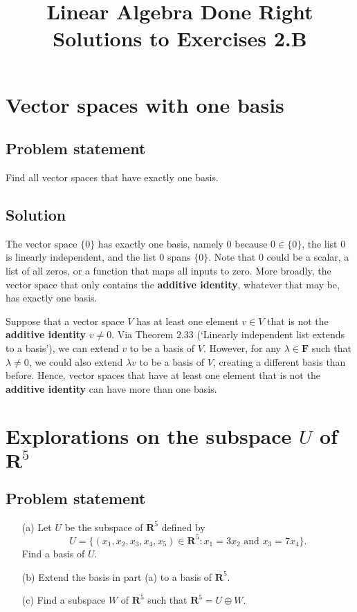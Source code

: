 \documentclass{article}
\title{Linear Algebra Done Right\\Solutions to Exercises 2.B}
\author{}
\date{}
\begin{document}
\maketitle

\section{Vector spaces with one basis}
\subsection*{Problem statement}
Find all vector spaces that have exactly one basis.

\subsection*{Solution}
The vector space $\{0\}$ has exactly one basis, namely $0$ because $0\in\{0\}$, the list $0$ is linearly independent, and the list $0$ spans $\{0\}$. 
Note that $0$ could be a scalar, a list of all zeros, or a function that maps all inputs to zero. 
More broadly, the vector space that only contains the \textbf{additive identity}, whatever that may be, has exactly one basis. 

Suppose that a vector space $V$ has at least one element $v\in V$ that is not the \textbf{additive identity} $v\neq0$. 
Via Theorem 2.33 (`Linearly independent list extends to a basis'), we can extend $v$ to be a basis of $V$. 
However, for any $\lambda\in\mathbf{F}$ such that $\lambda\neq 0$, we could also extend $\lambda v$ to be a basis of $V$, creating a different basis than before. 
Hence, vector spaces that have at least one element that is not the \textbf{additive identity} can have more than one basis.

\clearpage

\section{Explorations on the subspace $U$ of $\mathbf{R}^5$}
\subsection*{Problem statement}
\begin{enumerate}
    \item[(a)] Let $U$ be the subspace of $\mathbf{R}^5$ defined by \[U=\{(x_1,x_2,x_3,x_4,x_5)\in\mathbf{R}^5:x_1=3x_2\text{ and }x_3=7x_4\}.\] Find a basis of $U$.
    \item[(b)] Extend the basis in part (a) to a basis of $\mathbf{R}^5$.
    \item[(c)] Find a subspace $W$ of $\mathbf{R}^5$ such that $\mathbf{R}^5=U\oplus W$.
\end{enumerate}
\end{document}

